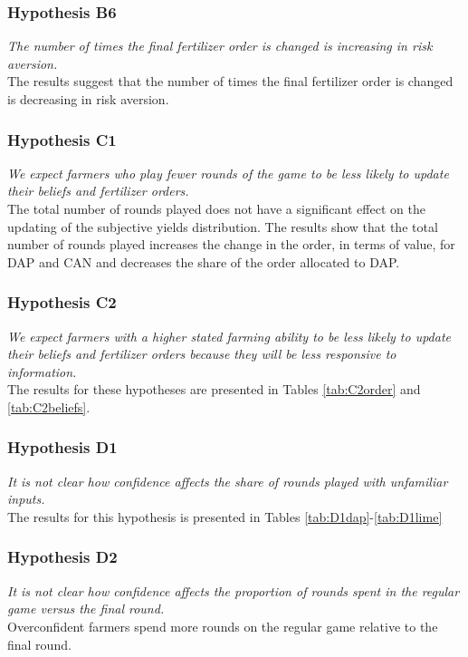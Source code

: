 \documentclass[12pt,letterpaper]{article}
\begin{document}



\newpage
\subsubsection*{Hypothesis B6}
\textit{The number of times the final fertilizer order is changed is increasing in risk aversion.}\\
The results suggest that the number of times the final fertilizer order is changed is decreasing in risk aversion. 



\newpage
\subsubsection*{Hypothesis C1}
\textit{We expect farmers who play fewer rounds of the game to be less likely to update their beliefs and fertilizer orders.}\\
The total number of rounds played does not have a significant effect on the updating of the subjective yields distribution. The results show that the total number of rounds played increases the change in the order, in terms of value, for DAP and CAN and decreases the share of the order allocated to DAP. 



\subsubsection*{Hypothesis C2}
\textit{We expect farmers with a higher stated farming ability to be less likely to update their beliefs and fertilizer orders because they will be less responsive to information.} \\
The results for these hypotheses are presented in  Tables  \ref{tab:C2order} and \ref{tab:C2beliefs}.  

\newpage
\subsubsection*{Hypothesis D1}
\textit{It is not clear how confidence affects the share of rounds played with unfamiliar inputs. } \\
The results for this hypothesis is presented in Tables
\ref{tab:D1dap}-\ref{tab:D1lime}

\subsubsection*{Hypothesis D2}
\textit{It is not clear how confidence affects the proportion of rounds spent in the regular game versus the final round.} \\
Overconfident farmers spend more rounds on the regular game relative to the final round. 
\end{document}
